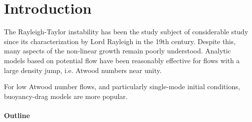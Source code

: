 \section{Introduction}

The Rayleigh-Taylor instability has been the study subject of considerable study since its characterization by Lord Rayleigh in the 19th century.
Despite this, many aspects of the non-linear growth remain poorly understood.
Analytic models based on potential flow have been reasonably effective for flows with a large density jump, i.e. Atwood numbers near unity.


For low Atwood number flows, and particularly single-mode initial conditions, buoyancy-drag models are more popular.


\paragraph{Outline}



